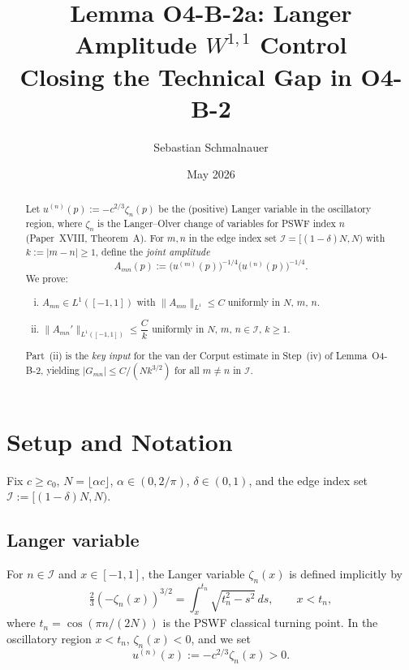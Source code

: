 \documentclass[12pt,a4paper]{amsart}
\title{Lemma O4-B-2a: Langer Amplitude $W^{1,1}$ Control\\
{\normalsize Closing the Technical Gap in O4-B-2}}
\author{Sebastian Schmalnauer}
\date{May 2026}
\theoremstyle{definition}
\newcommand{\norm}[1]{\|#1\|}
\newcommand{\dd}{\,d}
\begin{document}
\maketitle

\begin{abstract}
Let $u^{(n)}(p) := -c^{2/3}\zeta_n(p)$ be the (positive)
Langer variable in the oscillatory region,
where $\zeta_n$ is the Langer--Olver change of variables
for PSWF index $n$ (Paper~XVIII, Theorem~A).
For $m,n$ in the edge index set $\mathcal{I} = [(1-\delta)N,N)$
with $k := |m-n| \geq 1$, define the \emph{joint amplitude}
\[
  A_{mn}(p) := \bigl(u^{(m)}(p)\bigr)^{-1/4}\bigl(u^{(n)}(p)\bigr)^{-1/4}.
\]
We prove:
\begin{enumerate}[(i)]
  \item $A_{mn} \in L^1([-1,1])$ with
        $\norm{A_{mn}}_{L^1} \leq C$ uniformly in $N$, $m$, $n$.
  \item $\norm{A_{mn}'}_{L^1([-1,1])} \leq \dfrac{C}{k}$
        uniformly in $N$, $m$, $n \in \mathcal{I}$, $k \geq 1$.
\end{enumerate}
Part~(ii) is the \emph{key input} for the van der Corput estimate
in Step~(iv) of Lemma~O4-B-2, yielding
$|G_{mn}| \leq C/(N k^{3/2})$ for all $m \neq n$ in $\mathcal{I}$.
\end{abstract}

\tableofcontents

\section{Setup and Notation}
\label{sec:setup}

Fix $c \geq c_0$, $N = \lfloor \alpha c \rfloor$, $\alpha \in (0,2/\pi)$,
$\delta \in (0,1)$, and the edge index set $\mathcal{I} := [(1-\delta)N, N)$.

\subsection{Langer variable}

For $n \in \mathcal{I}$ and $x \in [-1,1]$, the Langer variable $\zeta_n(x)$
is defined implicitly by
\begin{equation}\label{eq:langer}
  \tfrac{2}{3}(-\zeta_n(x))^{3/2} = \int_x^{t_n} \sqrt{t_n^2 - s^2}\dd s,
  \qquad x < t_n,
\end{equation}
where $t_n = \cos(\pi n/(2N))$ is the PSWF classical turning point.
In the oscillatory region $x < t_n$, $\zeta_n(x) < 0$, and we set
\[
  u^{(n)}(x) := -c^{2/3}\zeta_n(x) > 0.
\]
\end{document}
